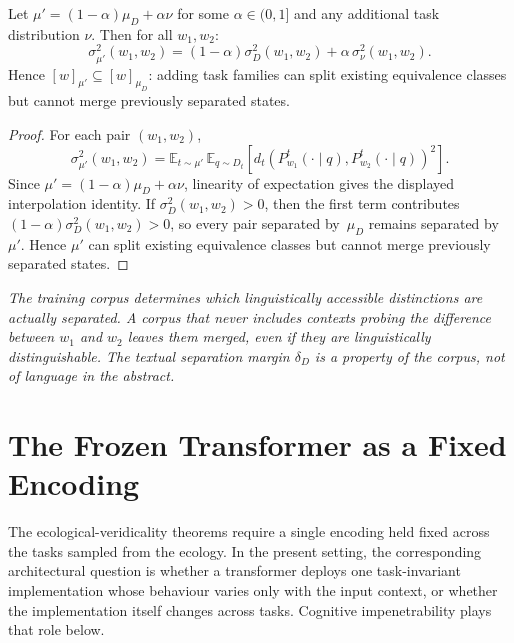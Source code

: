 \documentclass[twoside,11pt]{article}
\newenvironment{interpretation}{\par\noindent{\bf Interpretation.}\itshape}{\par}
\newcommand{\sigmasq}{\sigma^2}
\newcommand{\E}{\mathbb{E}}
\begin{document}
\begin{proposition}\label{prop:ecology-expansion}
Let $\mu' = (1-\alpha)\mu_D + \alpha \nu$ for some $\alpha \in (0,1]$ and any additional task distribution $\nu$. Then for all $w_1,w_2$:
\[
\sigmasq_{\mu'}(w_1,w_2) = (1-\alpha)\sigmasq_D(w_1,w_2) + \alpha\, \sigmasq_\nu(w_1,w_2).
\]
Hence $[w]_{\mu'} \subseteq [w]_{\mu_D}$: adding task families can split existing equivalence classes but cannot merge previously separated states.
\end{proposition}

\begin{proof}
For each pair $(w_1,w_2)$,
\[
\sigmasq_{\mu'}(w_1,w_2)
= \E_{t\sim \mu'}\,\E_{q\sim D_t}[d_t(P^t_{w_1}(\cdot\mid q),P^t_{w_2}(\cdot\mid q))^2].
\]
Since $\mu'=(1-\alpha)\mu_D+\alpha\nu$, linearity of expectation gives the displayed interpolation identity. If $\sigmasq_D(w_1,w_2)>0$, then the first term contributes $(1-\alpha)\sigmasq_D(w_1,w_2)>0$, so every pair separated by~$\mu_D$ remains separated by~$\mu'$. Hence $\mu'$ can split existing equivalence classes but cannot merge previously separated states.
\end{proof}

\begin{interpretation}
The training corpus determines which linguistically accessible distinctions are actually separated. A corpus that never includes contexts probing the difference between $w_1$ and $w_2$ leaves them merged, even if they are linguistically distinguishable. The textual separation margin $\delta_D$ is a property of the corpus, not of language in the abstract.
\end{interpretation}

\section{The Frozen Transformer as a Fixed Encoding}\label{sec:frozen}

The ecological-veridicality theorems require a single encoding held fixed across the tasks sampled from the ecology. In the present setting, the corresponding architectural question is whether a transformer deploys one task-invariant implementation whose behaviour varies only with the input context, or whether the implementation itself changes across tasks. Cognitive impenetrability plays that role below.
\end{document}
